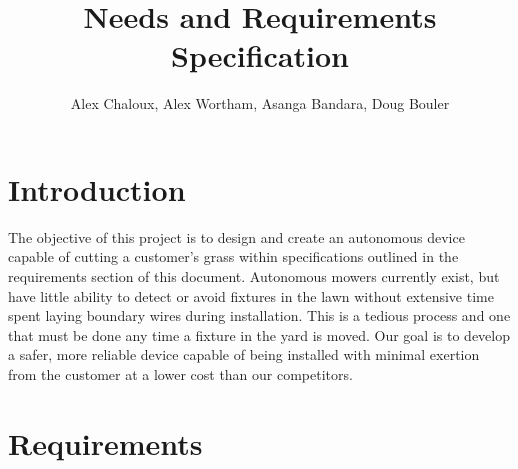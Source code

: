 \documentclass[12pt,letterpaper]{article}
\author{Alex Chaloux, Alex Wortham, Asanga Bandara, Doug Bouler}
\title{Needs and Requirements Specification}
\begin{document}
\reqstitlepage

\section*{Introduction}

\begin{doublespace}
The objective of this project is to design and create an autonomous device capable of cutting a customer’s grass within specifications outlined in the requirements section of this document. Autonomous mowers currently exist, but have little ability to detect or avoid fixtures in the lawn without extensive time spent laying boundary wires during installation. This is a tedious process and one that must be done any time a fixture in the yard is moved. Our goal is to develop a safer, more reliable device capable of being installed with minimal exertion from the customer at a lower cost than our competitors. 
\end{doublespace}

\section*{Requirements}
\end{document}
